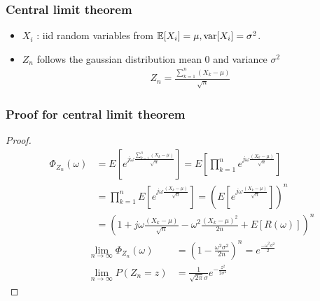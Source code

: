 \documentclass[10pt,mathserif]{beamer}
\begin{document}
\begin{frame}
\frametitle{Central limit theorem}
\begin{itemize}
\item $X_i$ : iid random variables from  $\mathbb{E}[X_i] = \mu, \mathrm{var}[X_i]=\sigma^2$.
\item $Z_n$ follows the gaussian distribution mean 0 and variance $\sigma^2$   
\begin{align}
Z_n=\frac{\sum_{k=1}^{n} (X_k-\mu)}{\sqrt{n}}\nonumber
\end{align}
\end{itemize}
\end{frame}
\begin{frame}
    \frametitle{Proof for central limit theorem}
\begin{proof}
\begin{align}
\Phi_{Z_n}(\omega) &= E[e^{j\omega \frac{\sum_{k=1}^{n} (X_k-\mu)}{\sqrt{n}}}]= E[\prod_{k=1}^{n}e^{j\omega \frac{(X_k-\mu)}{\sqrt{n}}}]\nonumber\\ 
&=\prod_{k=1}^{n}E[e^{j\omega \frac{(X_k-\mu)}{\sqrt{n}}}] = (E[e^{j\omega \frac{(X_k-\mu)}{\sqrt{n}}}])^n \nonumber\\
&=(1+j\omega \frac{(X_k-\mu)}{\sqrt{n}}-\omega^2 \frac{(X_k-\mu)^2}{2n}+E[R(\omega)])^n \nonumber
\end{align}
\begin{align}
\lim_{n\to \infty}\Phi_{Z_n}(\omega)&=(1-\frac{\omega^2\sigma^2}{2n})^n= e^{\frac{-\omega^2\sigma^2}{2}} \nonumber \\
\lim_{n\to \infty} P(Z_n = z)&=\frac{1}{\sqrt{2\pi}\sigma}e^{-\frac{z^2}{2\sigma^2}}\nonumber
\end{align}

\end{proof}

\end{frame}
\end{document}
